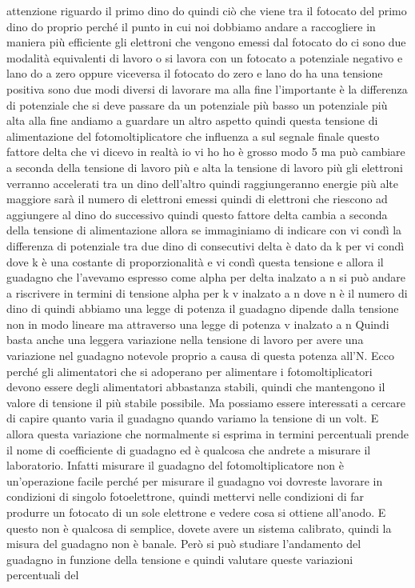 {attenzione riguardo il primo dino do quindi ciò che viene tra il fotocato del primo dino do proprio perché il punto in cui noi dobbiamo andare a raccogliere in maniera più efficiente gli elettroni che vengono emessi dal fotocato do ci sono due modalità equivalenti di lavoro o si lavora con un fotocato a potenziale negativo e lano do a zero oppure viceversa il fotocato do zero e lano do ha una tensione positiva sono due modi diversi di lavorare ma alla fine l'importante è la differenza di potenziale che si deve passare da un potenziale più basso un potenziale più alta alla fine andiamo a guardare un altro aspetto quindi questa tensione di alimentazione del fotomoltiplicatore che influenza a sul segnale finale questo fattore delta che vi dicevo in realtà io vi ho ho è grosso modo 5 ma può cambiare a seconda della tensione di lavoro più e alta la tensione di lavoro più gli elettroni verranno accelerati tra un dino dell'altro quindi raggiungeranno energie più alte maggiore sarà il numero di elettroni emessi quindi di elettroni che riescono ad aggiungere al dino do successivo quindi questo fattore delta cambia a seconda della tensione di alimentazione allora se immaginiamo di indicare con vi condì la differenza di potenziale tra due dino di consecutivi delta è dato da k per vi condì dove k è una costante di proporzionalità e vi condì questa tensione e allora il guadagno che l'avevamo espresso come alpha per delta inalzato a n si può andare a riscrivere in termini di tensione alpha per k v inalzato a n dove n è il numero di dino di quindi abbiamo una legge di potenza il guadagno dipende dalla tensione non in modo lineare ma attraverso una legge di potenza v inalzato a n Quindi basta anche una leggera variazione nella tensione di lavoro per avere una variazione nel guadagno notevole proprio a causa di questa potenza all'N. Ecco perché gli alimentatori che si adoperano per alimentare i fotomoltiplicatori devono essere degli alimentatori abbastanza stabili, quindi che mantengono il valore di tensione il più stabile possibile. Ma possiamo essere interessati a cercare di capire quanto varia il guadagno quando variamo la tensione di un volt. E allora questa variazione che normalmente si esprima in termini percentuali prende il nome di coefficiente di guadagno ed è qualcosa che andrete a misurare il laboratorio. Infatti misurare il guadagno del fotomoltiplicatore non è un'operazione facile perché per misurare il guadagno voi dovreste lavorare in condizioni di singolo fotoelettrone, quindi mettervi nelle condizioni di far produrre un fotocato di un sole elettrone e vedere cosa si ottiene all'anodo. E questo non è qualcosa di semplice, dovete avere un sistema calibrato, quindi la misura del guadagno non è banale. Però si può studiare l'andamento del guadagno in funzione della tensione e quindi valutare queste variazioni percentuali del

}
